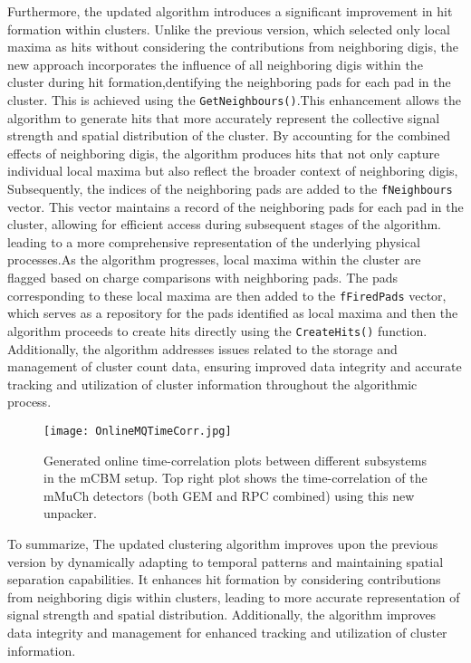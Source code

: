\documentclass{CBM-PR-2019}
\begin{document}
Furthermore, the updated algorithm introduces a significant improvement in hit formation within clusters. Unlike the previous version, which selected only local maxima as hits without considering the contributions from neighboring digis, the new approach incorporates the influence of all neighboring digis within the cluster during hit formation,dentifying the neighboring pads for each pad in the cluster. This is achieved using the \texttt{GetNeighbours()}.This enhancement allows the algorithm to generate hits that more accurately represent the collective signal strength and spatial distribution of the cluster. By accounting for the combined effects of neighboring digis, the algorithm produces hits that not only capture individual local maxima but also reflect the broader context of neighboring digis, Subsequently, the indices of the neighboring pads are added to the \texttt{fNeighbours} vector. This vector maintains a record of the neighboring pads for each pad in the cluster, allowing for efficient access during subsequent stages of the algorithm. leading to a more comprehensive representation of the underlying physical processes.As the algorithm progresses, local maxima within the cluster are flagged based on charge comparisons with neighboring pads. The pads corresponding to these local maxima are then added to the \texttt{fFiredPads} vector, which serves as a repository for the pads identified as local maxima and then the algorithm proceeds to create hits directly using the \texttt{CreateHits()} function.  Additionally, the algorithm addresses issues related to the storage and management of cluster count data, ensuring improved data integrity and accurate tracking and utilization of cluster information throughout the algorithmic process.
\begin{figure}[htb]
\begin{center}
\texttt{[image: OnlineMQTimeCorr.jpg]}
\caption{Generated online time-correlation plots between different subsystems in the mCBM setup. Top right plot shows the time-correlation of the mMuCh detectors (both GEM and RPC combined) using this new unpacker.}
\label{fig:mq}
\end{center}
\end{figure}

To summarize, The updated clustering algorithm improves upon the previous version by dynamically adapting to temporal patterns and maintaining spatial separation capabilities. It enhances hit formation by considering contributions from neighboring digis within clusters, leading to more accurate representation of signal strength and spatial distribution. Additionally, the algorithm improves data integrity and management for enhanced tracking and utilization of cluster information.
\end{document}
